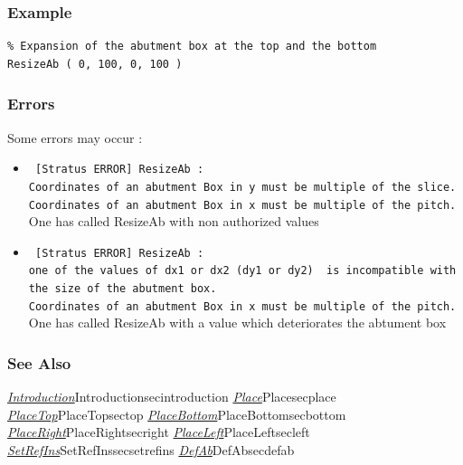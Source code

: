 \subsubsection{Example}

\begin{verbatim}
% Expansion of the abutment box at the top and the bottom
ResizeAb ( 0, 100, 0, 100 )
\end{verbatim}

\subsubsection{Errors}
    
Some errors may occur :
\begin{itemize}
    \item \verb- [Stratus ERROR] ResizeAb :-\\\verb-Coordinates of an abutment Box in y must be multiple of the slice.-\\\verb-Coordinates of an abutment Box in x must be multiple of the pitch.-\\One has called ResizeAb with non authorized values
    \item \verb- [Stratus ERROR] ResizeAb :-\\\verb-one of the values of dx1 or dx2 (dy1 or dy2)  is incompatible with-\\\verb-the size of the abutment box.-\\\verb-Coordinates of an abutment Box in x must be multiple of the pitch.-\\One has called ResizeAb with a value which deteriorates the abtument box
\end{itemize}

\begin{htmlonly}

\subsubsection{See Also}

\hyperref[ref]{\emph{Introduction}}{}{Introduction}{secintroduction}
\hyperref[ref]{\emph{Place}}{}{Place}{secplace}
\hyperref[ref]{\emph{PlaceTop}}{}{PlaceTop}{sectop}
\hyperref[ref]{\emph{PlaceBottom}}{}{PlaceBottom}{secbottom}
\hyperref[ref]{\emph{PlaceRight}}{}{PlaceRight}{secright}
\hyperref[ref]{\emph{PlaceLeft}}{}{PlaceLeft}{secleft}
\hyperref[ref]{\emph{SetRefIns}}{}{SetRefIns}{secsetrefins}
\hyperref[ref]{\emph{DefAb}}{}{DefAb}{secdefab}

\end{htmlonly}
